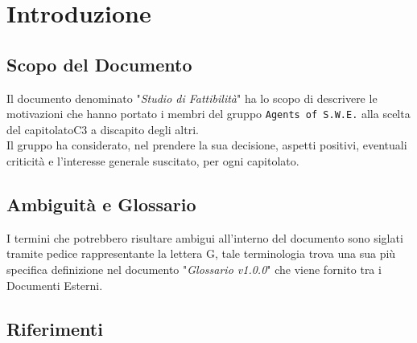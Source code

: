 \section{Introduzione}\label{intro}

\subsection{Scopo del Documento}
Il documento denominato "\textit{Studio di Fattibilità}" ha lo scopo di descrivere le motivazioni che hanno portato i membri del gruppo \texttt{Agents of S.W.E.} alla scelta del capitolato\glossario C3 a discapito degli altri.\\
Il gruppo ha considerato, nel prendere la sua decisione, aspetti positivi, eventuali criticità e l'interesse generale suscitato, per ogni capitolato.

\subsection{Ambiguità e Glossario}
I termini che potrebbero risultare ambigui all'interno del documento sono siglati tramite pedice rappresentante la lettera \textmd{G}, tale terminologia trova una sua più specifica definizione nel documento "\textit{Glossario v1.0.0}" che viene fornito tra i Documenti Esterni.

\subsection{Riferimenti}

